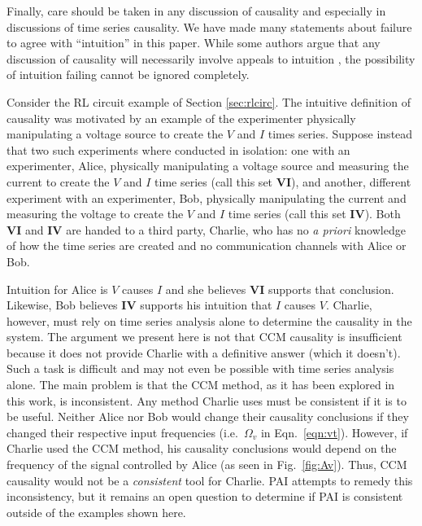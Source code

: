 \documentclass[twocolumn,aps,pre,groupedaddress]{revtex4-1}
\begin{document}
Finally, care should be taken in any discussion of causality and especially in discussions of time series causality.  We have made many statements about failure to agree with ``intuition'' in this paper.  While some authors argue that any discussion of causality will necessarily involve appeals to intuition \cite{Pearl2000}, the possibility of intuition failing cannot be ignored completely.  

Consider the RL circuit example of Section \ref{sec:rlcirc}.  The intuitive definition of causality was motivated by an example of the experimenter physically manipulating a voltage source to create the $V$ and $I$ times series.  Suppose instead that two such experiments where conducted in isolation: one with an experimenter, Alice, physically manipulating a voltage source and measuring the current to create the $V$ and $I$ time series (call this set $\mathbf{VI}$), and another, different experiment with an experimenter, Bob, physically manipulating the current and measuring the voltage to create the $V$ and $I$ time series (call this set $\mathbf{IV}$).  Both $\mathbf{VI}$ and $\mathbf{IV}$ are handed to a third party, Charlie, who has no {\em a priori} knowledge of how the time series are created and no communication channels with Alice or Bob.

Intuition for Alice is $V$ causes $I$ and she believes $\mathbf{VI}$ supports that conclusion.  Likewise, Bob believes $\mathbf{IV}$ supports his intuition that $I$ causes $V$.  Charlie, however, must rely on time series analysis alone to determine the causality in the system.  The argument we present here is not that CCM causality is insufficient because it does not provide Charlie with a definitive answer (which it doesn't).  Such a task is difficult and may not even be possible with time series analysis alone\cite{Pearl2000}.  The main problem is that the CCM method, as it has been explored in this work, is inconsistent.  Any method Charlie uses must be consistent if it is to be useful.  Neither Alice nor Bob would change their causality conclusions if they changed their respective input frequencies (i.e.\ $\Omega_v$ in Eqn.\ \ref{eqn:vt}).  However, if Charlie used the CCM method, his causality conclusions would depend on the frequency of the signal controlled by Alice (as seen in Fig.\ \ref{fig:Av}).  Thus, CCM causality would not be a {\em consistent} tool for Charlie.  PAI attempts to remedy this inconsistency, but it remains an open question to determine if PAI is consistent outside of the examples shown here.

%

\end{document}
